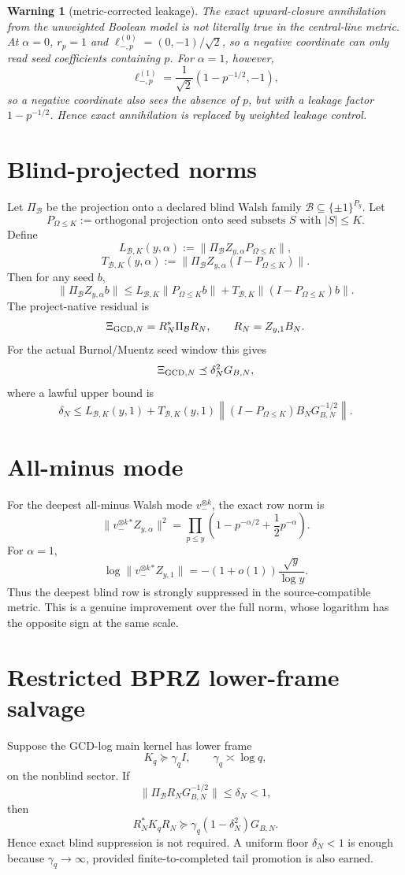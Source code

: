 \documentclass[11pt]{article}
\newtheorem{warning}{Warning}
\newcommand{\B}{\mathcal B}
\begin{document}
\begin{warning}[metric-corrected leakage]
The exact upward-closure annihilation from the unweighted Boolean model is not literally true in the central-line metric. At $\alpha=0$, $r_p=1$ and $\ell_{-,p}^{(0)}=(0,-1)/\sqrt2$, so a negative coordinate can only read seed coefficients containing $p$. For $\alpha=1$, however,
\[
  \ell_{-,p}^{(1)}=\frac1{\sqrt2}(1-p^{-1/2},-1),
\]
so a negative coordinate also sees the absence of $p$, but with a leakage factor $1-p^{-1/2}$. Hence exact annihilation is replaced by weighted leakage control.
\end{warning}

\section{Blind-projected norms}
Let $\Pi_\B$ be the projection onto a declared blind Walsh family $\B\subseteq\{\pm1\}^{P_y}$. Let
\[
  P_{\Omega\le K}
  :=
  \text{orthogonal projection onto seed subsets }S\text{ with }|S|\le K.
\]
Define
\[
  L_{\B,K}(y,\alpha)
  :=\|\Pi_\B Z_{y,\alpha}P_{\Omega\le K}\|,
\]
\[
  T_{\B,K}(y,\alpha)
  :=\|\Pi_\B Z_{y,\alpha}(I-P_{\Omega\le K})\|.
\]
Then for any seed $b$,
\[
  \|\Pi_\B Z_{y,\alpha}b\|
  \le
  L_{\B,K}\|P_{\Omega\le K}b\|+T_{\B,K}\|(I-P_{\Omega\le K})b\|.
\]
The project-native residual is
\[
  \Xi_{{\rm GCD},N}
  =R_N^*\Pi_\B R_N,
  \qquad R_N=Z_{y,1}B_N.
\]
For the actual Burnol/Muentz seed window this gives
\[
  \Xi_{{\rm GCD},N}
  \preceq
  \delta_N^2G_{B,N},
\]
where a lawful upper bound is
\[
  \delta_N
  \le
  L_{\B,K}(y,1)
  +T_{\B,K}(y,1)
  \left\|(I-P_{\Omega\le K})B_NG_{B,N}^{-1/2}\right\|.
\]

\section{All-minus mode}
For the deepest all-minus Walsh mode $v_-^{\otimes k}$, the exact row norm is
\[
  \|v_-^{\otimes k}{}^*Z_{y,\alpha}\|^2
  =\prod_{p\le y}\left(1-p^{-\alpha/2}+\frac12p^{-\alpha}\right).
\]
For $\alpha=1$,
\[
  \log \|v_-^{\otimes k}{}^*Z_{y,1}\|
  =-(1+o(1))\frac{\sqrt y}{\log y}.
\]
Thus the deepest blind row is strongly suppressed in the source-compatible metric. This is a genuine improvement over the full norm, whose logarithm has the opposite sign at the same scale.

\section{Restricted BPRZ lower-frame salvage}
Suppose the GCD-log main kernel has lower frame
\[
  K_q\succeq \gamma_q I,
  \qquad \gamma_q\asymp\log q,
\]
on the nonblind sector. If
\[
  \|\Pi_\B R_NG_{B,N}^{-1/2}\|\le \delta_N<1,
\]
then
\[
  R_N^*K_qR_N
  \succeq
  \gamma_q(1-
\delta_N^2)G_{B,N}.
\]
Hence exact blind suppression is not required. A uniform floor $\delta_N<1$ is enough because $\gamma_q\to\infty$, provided finite-to-completed tail promotion is also earned.
\end{document}
